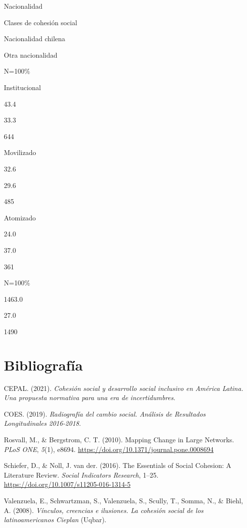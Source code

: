 \documentclass[
  12pt,
]{book}
\begin{document}
Nacionalidad

Clases de cohesión social

Nacionalidad chilena

Otra nacionalidad

N=100\%

Institucional

43.4

33.3

644

Movilizado

32.6

29.6

485

Atomizado

24.0

37.0

361

N=100\%

1463.0

27.0

1490

\hypertarget{bibliografuxeda}{%
\chapter*{Bibliografía}\label{bibliografuxeda}}

\hypertarget{refs}{}
\leavevmode\hypertarget{ref-cepal_cohesion_2021}{}%
CEPAL. (2021). \emph{Cohesión social y desarrollo social inclusivo en América Latina. Una propuesta normativa para una era de incertidumbres}.

\leavevmode\hypertarget{ref-coes_radiografia_2019}{}%
COES. (2019). \emph{Radiografía del cambio social. Análisis de Resultados Longitudinales 2016-2018}.

\leavevmode\hypertarget{ref-rosvall_mapping_2010}{}%
Rosvall, M., \& Bergstrom, C. T. (2010). Mapping Change in Large Networks. \emph{PLoS ONE}, \emph{5}(1), e8694. \url{https://doi.org/10.1371/journal.pone.0008694}

\leavevmode\hypertarget{ref-schiefer_essentials_2016}{}%
Schiefer, D., \& Noll, J. van der. (2016). The Essentials of Social Cohesion: A Literature Review. \emph{Social Indicators Research}, 1--25. \url{https://doi.org/10.1007/s11205-016-1314-5}

\leavevmode\hypertarget{ref-valenzuela_vinculos_2008}{}%
Valenzuela, E., Schwartzman, S., Valenzuela, S., Scully, T., Somma, N., \& Biehl, A. (2008). \emph{Vínculos, creencias e ilusiones. La cohesión social de los latinoamericanos Cieplan} (Uqbar).
\end{document}
